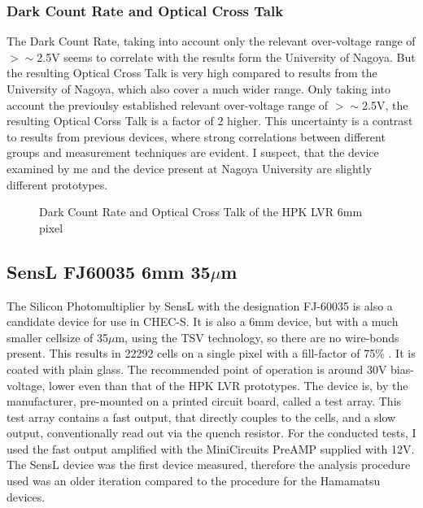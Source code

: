 \documentclass[12pt,article,type=msc,colorback,accentcolor=tud9c]{tudthesis}
\begin{document}
\subsubsection{Dark Count Rate and Optical Cross Talk}
\label{subsubsec:LVR6DCROCT}
The Dark Count Rate, taking into account only the relevant over-voltage range of $>\sim$2.5V seems to correlate with the results form the University of Nagoya. But the resulting Optical Cross Talk is very high compared to results from the University of Nagoya, which also cover a much wider range. Only taking into account the previoulsy established relevant over-voltage range of $>\sim$2.5V, the resulting Optical Corss Talk is a factor of 2 higher. This uncertainty is a contrast to results from previous devices, where strong correlations between different groups and measurement techniques are evident. I suspect, that the device examined by me and the device present at Nagoya University are slightly different prototypes.
\begin{figure}[h]
\begin{centering}
\caption{Dark Count Rate and Optical Cross Talk of the HPK LVR 6mm pixel}
\label{fig:LVR6_DCROCT}
\end{centering}
\end{figure}



\clearpage
\subsection{SensL FJ60035 6mm 35$\mu$m}
The Silicon Photomultiplier by SensL with the designation FJ-60035 is also a candidate device for use in CHEC-S. It is also a 6mm device, but with a much smaller cellsize of 35$\mu$m, using the TSV technology, so there are no wire-bonds present. This results in 22292 cells on a single pixel with a fill-factor of 75\% . It is coated with plain glass. The recommended point of operation is around 30V bias-voltage, lower even than that of the HPK LVR prototypes. The device is, by the manufacturer, pre-mounted on a printed circuit board, called a test array. This test array contains a fast output, that directly couples to the cells, and a slow output, conventionally read out via the quench resistor. For the conducted tests, I used the fast output amplified with the MiniCircuits PreAMP supplied with 12V. The SensL device was the first device measured, therefore the analysis procedure used was an older iteration compared to the procedure for the Hamamatsu devices. 
\end{document}
